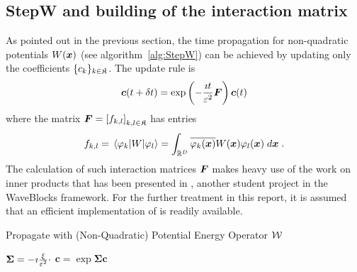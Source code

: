 \subsection{StepW and building of the interaction matrix}
%
As pointed out in the previous section, the time propagation for non-quadratic potentials $W(\bm{x})$ (see algorithm~\ref{alg:StepW}) can be achieved by updating only the coefficients $\{ c_k \}_{k \in \mathfrak{K}}$.
The update rule is
%
\begin{align}
	\bm{c}(t + \delta t) = \exp \left( - \frac{\imath t}{\varepsilon^2} \bm{F} \right) \bm{c}(t)
\end{align}
%
where the matrix $\bm{F} = \left[ f_{k,l} \right]_{k,l \in \mathfrak{K}}$ has entries
%
\begin{align}
	f_{k,l} = \matrixel{\varphi_k}{W}{\varphi_l}
	= \int_{\R^D} \conj{\varphi_k(\bvec{x})} W(\bvec{x}) \varphi_l(\bvec{x}) \; \dif \bvec{x} \; .
\end{align}
%
The calculation of such interaction matrices $\bm{F}$ makes heavy use of the work on inner products that has been presented in \cite{LWB_innerproducts}, another student project in the WaveBlocks framework.
For the further treatment in this report, it is assumed that an efficient implementation of  is readily available.
%
\begin{algorithm}[ht]
	\caption{Propagate with (Non-Quadratic) Potential Energy Operator $\mathcal{W}$}
	\label{alg:StepW}
	\begin{algorithmic}
		\State
			\State $\bm{\Sigma} = - \imath \frac{\xi}{\varepsilon^2} \cdot$ 
			\State $\bm{c} = \exp{\bm{\Sigma}} \bm{c}$
		\EndProcedure
		\State
	\end{algorithmic}
\end{algorithm}
